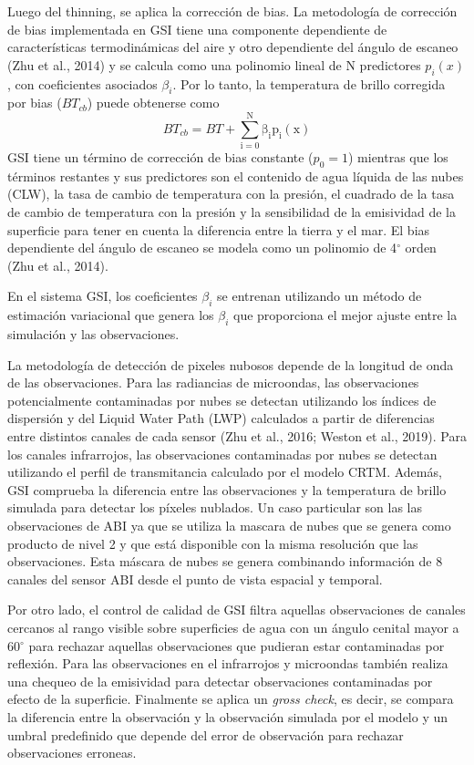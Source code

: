 \documentclass[12pt,oneside,a4paper]{reedthesis}
\begin{document}
Luego del thinning, se aplica la corrección de bias. La metodología de corrección de bias implementada en GSI tiene una componente dependiente de características termodinámicas del aire y otro dependiente del ángulo de escaneo (Zhu et al., 2014) y se calcula como una polinomio lineal de N predictores \(p_i(x)\), con coeficientes asociados \(\beta_i\). Por lo tanto, la temperatura de brillo corregida por bias (\(BT_{cb}\)) puede obtenerse como
\begin{equation}
\mathrm{\mathit{BT_{cb}} =\mathit{ BT} + \sum_{i = 0}^{N} \beta_i p_i (x)}
\label{eq:eq12}
\end{equation}
GSI tiene un término de corrección de bias constante (\(p_0 = 1\)) mientras que los términos restantes y sus predictores son el contenido de agua líquida de las nubes (CLW), la tasa de cambio de temperatura con la presión, el cuadrado de la tasa de cambio de temperatura con la presión y la sensibilidad de la emisividad de la superficie para tener en cuenta la diferencia entre la tierra y el mar. El bias dependiente del ángulo de escaneo se modela como un polinomio de 4\(^\circ\) orden (Zhu et al., 2014).

En el sistema GSI, los coeficientes \(\beta_i\) se entrenan utilizando un método de estimación variacional que genera los \(\beta_i\) que proporciona el mejor ajuste entre la simulación y las observaciones.

La metodología de detección de pixeles nubosos depende de la longitud de onda de las observaciones. Para las radiancias de microondas, las observaciones potencialmente contaminadas por nubes se detectan utilizando los índices de dispersión y del Liquid Water Path (LWP) calculados a partir de diferencias entre distintos canales de cada sensor (Zhu et al., 2016; Weston et al., 2019). Para los canales infrarrojos, las observaciones contaminadas por nubes se detectan utilizando el perfil de transmitancia calculado por el modelo CRTM. Además, GSI comprueba la diferencia entre las observaciones y la temperatura de brillo simulada para detectar los píxeles nublados. Un caso particular son las las observaciones de ABI ya que se utiliza la mascara de nubes que se genera como producto de nivel 2 y que está disponible con la misma resolución que las observaciones. Esta máscara de nubes se genera combinando información de 8 canales del sensor ABI desde el punto de vista espacial y temporal.

Por otro lado, el control de calidad de GSI filtra aquellas observaciones de canales cercanos al rango visible sobre superficies de agua con un ángulo cenital mayor a 60\(^{\circ}\) para rechazar aquellas observaciones que pudieran estar contaminadas por reflexión. Para las observaciones en el infrarrojos y microondas también realiza una chequeo de la emisividad para detectar observaciones contaminadas por efecto de la superficie. Finalmente se aplica un \emph{gross check}, es decir, se compara la diferencia entre la observación y la observación simulada por el modelo y un umbral predefinido que depende del error de observación para rechazar observaciones erroneas.
\end{document}
